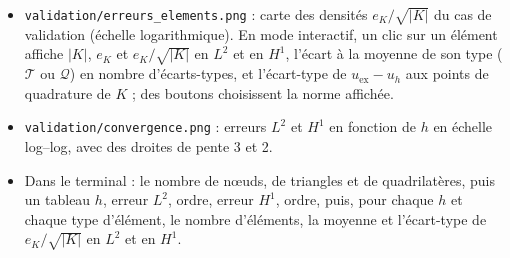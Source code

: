 \documentclass[11pt,a4paper]{article}
\begin{document}
\begin{itemize}
        $\partial\beta$ et le bilan (section~\ref{sec:flux}). Ces grandeurs
        sont aussi affichées dans le terminal. Ces trois fichiers portent le
        même suffixe que la solution.
  \item \texttt{validation/erreurs\_elements.png} : carte des densités
        $e_K / \sqrt{|K|}$ du cas de validation (échelle logarithmique). En
        mode interactif, un clic sur un élément affiche $|K|$, $e_K$ et
        $e_K / \sqrt{|K|}$ en $L^2$ et en $H^1$, l'écart à la moyenne de son
        type ($\mathcal{T}$ ou $\mathcal{Q}$) en nombre d'écarts-types, et
        l'écart-type de $u_{\mathrm{ex}} - u_h$ aux points de quadrature de
        $K$ ; des boutons choisissent la norme affichée.
  \item \texttt{validation/convergence.png} : erreurs $L^2$ et $H^1$ en fonction de
        $h$ en échelle log--log, avec des droites de pente 3 et 2.
  \item Dans le terminal : le nombre de nœuds, de triangles et de
        quadrilatères, puis un tableau $h$, erreur $L^2$, ordre, erreur
        $H^1$, ordre, puis, pour chaque $h$ et chaque type
        d'élément, le nombre d'éléments, la moyenne et l'écart-type de
        $e_K / \sqrt{|K|}$ en $L^2$ et en $H^1$.
\end{itemize}
\end{document}
